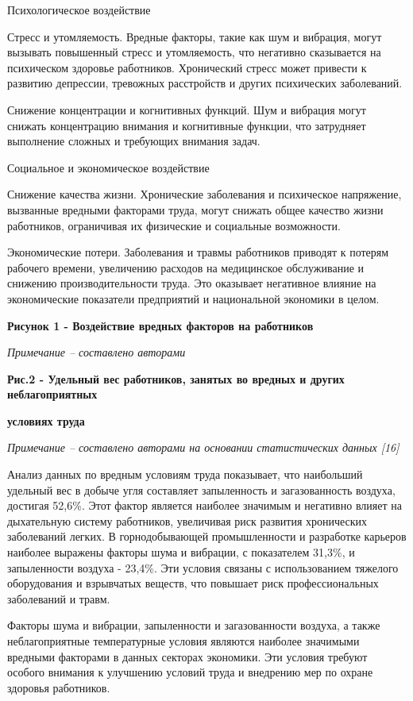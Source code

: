 Психологическое воздействие

Стресс и утомляемость. Вредные факторы, такие как шум и вибрация, могут
вызывать повышенный стресс и утомляемость, что негативно сказывается на
психическом здоровье работников. Хронический стресс может привести к
развитию депрессии, тревожных расстройств и других психических
заболеваний.

Снижение концентрации и когнитивных функций. Шум и вибрация могут
снижать концентрацию внимания и когнитивные функции, что затрудняет
выполнение сложных и требующих внимания задач.

Социальное и экономическое воздействие

Снижение качества жизни. Хронические заболевания и психическое
напряжение, вызванные вредными факторами труда, могут снижать общее
качество жизни работников, ограничивая их физические и социальные
возможности.

Экономические потери. Заболевания и травмы работников приводят к потерям
рабочего времени, увеличению расходов на медицинское обслуживание и
снижению производительности труда. Это оказывает негативное влияние на
экономические показатели предприятий и национальной экономики в целом.

{\bfseries Рисунок 1 - Воздействие вредных факторов на работников}

\emph{Примечание -- составлено авторами}

{\bfseries Рис.2 - Удельный вес работников, занятых во вредных и других
неблагоприятных}

{\bfseries условиях труда}

\emph{Примечание -- составлено авторами на основании статистических
данных {[}16{]}}

Анализ данных по вредным условиям труда показывает, что наибольший
удельный вес в добыче угля составляет запыленность и загазованность
воздуха, достигая 52,6\%. Этот фактор является наиболее значимым и
негативно влияет на дыхательную систему работников, увеличивая риск
развития хронических заболеваний легких. В горнодобывающей
промышленности и разработке карьеров наиболее выражены факторы шума и
вибрации, с показателем 31,3\%, и запыленности воздуха - 23,4\%. Эти
условия связаны с использованием тяжелого оборудования и взрывчатых
веществ, что повышает риск профессиональных заболеваний и травм.

Факторы шума и вибрации, запыленности и загазованности воздуха, а также
неблагоприятные температурные условия являются наиболее значимыми
вредными факторами в данных секторах экономики. Эти условия требуют
особого внимания к улучшению условий труда и внедрению мер по охране
здоровья работников.

